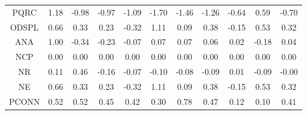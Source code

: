 \documentclass[11pt,a4paper]{report}
\begin{document}
\begin{longtable}{ | c || c | c | c | c | c | c | c | c | c || c |}
PQRC &  \cellcolor[HTML]{DFDFFF} 1.18 &  \cellcolor[HTML]{FFE7E7} -0.98 &  \cellcolor[HTML]{FFE7E7} -0.97 &  \cellcolor[HTML]{FFE7E7} -1.09 &  \cellcolor[HTML]{FFD7D7} -1.70 &  \cellcolor[HTML]{FFD7D7} -1.46 &  \cellcolor[HTML]{FFDFDF} -1.26 &  \cellcolor[HTML]{FFEFEF} -0.64 &  \cellcolor[HTML]{EFEFFF} 0.59 &  \cellcolor[HTML]{FFEFEF} -0.70 \\
ODSPL &  \cellcolor[HTML]{EFEFFF} 0.66 &  \cellcolor[HTML]{F7F7FF} 0.33 &  \cellcolor[HTML]{F7F7FF} 0.23 &  \cellcolor[HTML]{FFF7F7} -0.32 &  \cellcolor[HTML]{E7E7FF} 1.11 &  \cellcolor[HTML]{FFFFFF} 0.09 &  \cellcolor[HTML]{F7F7FF} 0.38 &  \cellcolor[HTML]{FFFFFF} -0.15 &  \cellcolor[HTML]{EFEFFF} 0.53 &  \cellcolor[HTML]{F7F7FF} 0.32 \\
ANA &  \cellcolor[HTML]{E7E7FF} 1.00 &  \cellcolor[HTML]{FFF7F7} -0.34 &  \cellcolor[HTML]{FFF7F7} -0.23 &  \cellcolor[HTML]{FFFFFF} -0.07 &  \cellcolor[HTML]{FFFFFF} 0.07 &  \cellcolor[HTML]{FFFFFF} 0.07 &  \cellcolor[HTML]{FFFFFF} 0.06 &  \cellcolor[HTML]{FFFFFF} 0.02 &  \cellcolor[HTML]{FFF7F7} -0.18 &  \cellcolor[HTML]{FFFFFF} 0.04 \\
NCP &  \cellcolor[HTML]{FFFFFF} 0.00 &  \cellcolor[HTML]{FFFFFF} 0.00 &  \cellcolor[HTML]{FFFFFF} 0.00 &  \cellcolor[HTML]{FFFFFF} 0.00 &  \cellcolor[HTML]{FFFFFF} 0.00 &  \cellcolor[HTML]{FFFFFF} 0.00 &  \cellcolor[HTML]{FFFFFF} 0.00 &  \cellcolor[HTML]{FFFFFF} 0.00 &  \cellcolor[HTML]{FFFFFF} 0.00 &  \cellcolor[HTML]{FFFFFF} 0.00 \\
NR &  \cellcolor[HTML]{FFFFFF} 0.11 &  \cellcolor[HTML]{F7F7FF} 0.46 &  \cellcolor[HTML]{FFFFFF} -0.16 &  \cellcolor[HTML]{FFFFFF} -0.07 &  \cellcolor[HTML]{FFFFFF} -0.10 &  \cellcolor[HTML]{FFFFFF} -0.08 &  \cellcolor[HTML]{FFFFFF} -0.09 &  \cellcolor[HTML]{FFFFFF} 0.01 &  \cellcolor[HTML]{FFFFFF} -0.09 &  \cellcolor[HTML]{FFFFFF} -0.00 \\
NE &  \cellcolor[HTML]{EFEFFF} 0.66 &  \cellcolor[HTML]{F7F7FF} 0.33 &  \cellcolor[HTML]{F7F7FF} 0.23 &  \cellcolor[HTML]{FFF7F7} -0.32 &  \cellcolor[HTML]{E7E7FF} 1.11 &  \cellcolor[HTML]{FFFFFF} 0.09 &  \cellcolor[HTML]{F7F7FF} 0.38 &  \cellcolor[HTML]{FFFFFF} -0.15 &  \cellcolor[HTML]{EFEFFF} 0.53 &  \cellcolor[HTML]{F7F7FF} 0.32 \\
PCONN &  \cellcolor[HTML]{EFEFFF} 0.52 &  \cellcolor[HTML]{EFEFFF} 0.52 &  \cellcolor[HTML]{F7F7FF} 0.45 &  \cellcolor[HTML]{F7F7FF} 0.42 &  \cellcolor[HTML]{F7F7FF} 0.30 &  \cellcolor[HTML]{EFEFFF} 0.78 &  \cellcolor[HTML]{F7F7FF} 0.47 &  \cellcolor[HTML]{FFFFFF} 0.12 &  \cellcolor[HTML]{FFFFFF} 0.10 &  \cellcolor[HTML]{F7F7FF} 0.41 \\

\end{longtable}
\end{document}
